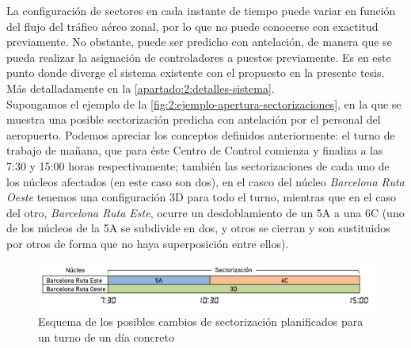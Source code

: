 %

La configuración de sectores en cada instante de tiempo puede variar en función del flujo del tráfico aéreo zonal, por 
lo que no puede conocerse con exactitud previamente. No obstante, puede ser predicho con antelación, de manera que 
se pueda realizar la asignación de controladores a puestos previamente.
Es en este punto donde diverge el sistema existente con el propuesto en la presente tesis. Más detalladamente en la 
\autoref{apartado:2:detalles-sistema}.
\\

Supongamos el ejemplo de la \autoref{fig:2:ejemplo-apertura-sectorizaciones}, en la que se muestra una posible 
sectorización predicha 
con antelación por el personal del aeropuerto. Podemos apreciar los conceptos definidos anteriormente: el turno de 
trabajo de mañana, que para éste \gls{Centro de Control} comienza y finaliza a las 7:30 y 15:00 horas respectivamente; 
también las sectorizaciones de cada uno de los núcleos afectados (en este caso son dos), en el casco del núcleo 
\textit{Barcelona Ruta Oeste} tenemos una configuración 3D para todo el turno, mientras que en el caso del otro, 
\textit{Barcelona Ruta Este}, ocurre un desdoblamiento de un 5A a una 6C (uno de los núcleos de la 5A se subdivide en 
dos, y otros se cierran y son sustituidos por otros de forma que no haya superposición entre ellos).

\begin{figure}[htbp]
	\centering
	\includegraphics[width=\linewidth]{ejemplo-apertura-sectorizaciones}
	\caption[Posibles cambios de sectorización planificados para un turno]{Esquema de los posibles cambios de 
	sectorización planificados para un turno de un día concreto}
	\label{fig:2:ejemplo-apertura-sectorizaciones}
\end{figure}

